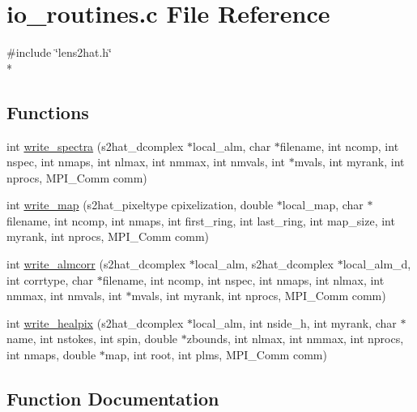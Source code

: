 \section{io\-\_\-routines.\-c File Reference}
\label{io__routines_8c}
{\ttfamily \#include \char`\"{}lens2hat.\-h\char`\"{}}\\*
\subsection*{Functions}
\begin{DoxyCompactItemize}
\item 
int \hyperlink{io__routines_8c_a57a613fceb4e1b32801d0c50f4a9580f}{write\-\_\-spectra} (s2hat\-\_\-dcomplex $\ast$local\-\_\-alm, char $\ast$filename, int ncomp, int nspec, int nmaps, int nlmax, int nmmax, int nmvals, int $\ast$mvals, int myrank, int nprocs, M\-P\-I\-\_\-\-Comm comm)
\item 
int \hyperlink{io__routines_8c_a5205158f26a9ba7db0eaf789833e39df}{write\-\_\-map} (s2hat\-\_\-pixeltype cpixelization, double $\ast$local\-\_\-map, char $\ast$filename, int ncomp, int nmaps, int first\-\_\-ring, int last\-\_\-ring, int map\-\_\-size, int myrank, int nprocs, M\-P\-I\-\_\-\-Comm comm)
\item 
int \hyperlink{io__routines_8c_a96435fc7f76abf485fe1731bb6286cac}{write\-\_\-almcorr} (s2hat\-\_\-dcomplex $\ast$local\-\_\-alm, s2hat\-\_\-dcomplex $\ast$local\-\_\-alm\-\_\-d, int corrtype, char $\ast$filename, int ncomp, int nspec, int nmaps, int nlmax, int nmmax, int nmvals, int $\ast$mvals, int myrank, int nprocs, M\-P\-I\-\_\-\-Comm comm)
\item 
int \hyperlink{io__routines_8c_aef41d743845f6f869c442b1fd82864a6}{write\-\_\-healpix} (s2hat\-\_\-dcomplex $\ast$local\-\_\-alm, int nside\-\_\-h, int myrank, char $\ast$name, int nstokes, int spin, double $\ast$zbounds, int nlmax, int nmmax, int nprocs, int nmaps, double $\ast$map, int root, int plms, M\-P\-I\-\_\-\-Comm comm)
\end{DoxyCompactItemize}


\subsection{Function Documentation}
